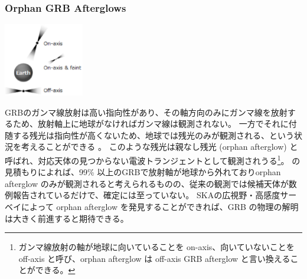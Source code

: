\subsubsection{Orphan GRB Afterglows}
\begin{table}
	\vspace{-4zh}
	\hspace{-4zw}
	\includegraphics[width=3.5cm,clip]{transients/transients.GRB-afterglow.eps}
\end{table}
GRBのガンマ線放射は高い指向性があり、その軸方向のみにガンマ線を放射するため、放射軸上に地球がなければガンマ線は観測されない。
一方でそれに付随する残光は指向性が高くないため、地球では残光のみが観測される、という状況を考えることができる \citep{1997ApJ...487L...1R}。
このような残光は親なし残光 (orphan afterglow) と呼ばれ、対応天体の見つからない電波トランジェントとして観測されうる\footnote{ガンマ線放射の軸が地球に向いていることを on-axis、向いていないことを off-axis と呼び、orphan afterglow は off-axis GRB afterglow と言い換えることができる。}。
\citet{2001ApJ...562L..55F}の見積もりによれば、99\% 以上のGRBで放射軸が地球から外れておりorphan afterglow のみが観測されると考えられるものの、従来の観測では候補天体が数例報告されているだけで、確定には至っていない。
SKAの広視野・高感度サーベイによって orphan afterglow を発見することができれば、GRB の物理の解明は大きく前進すると期待できる。
%

%
